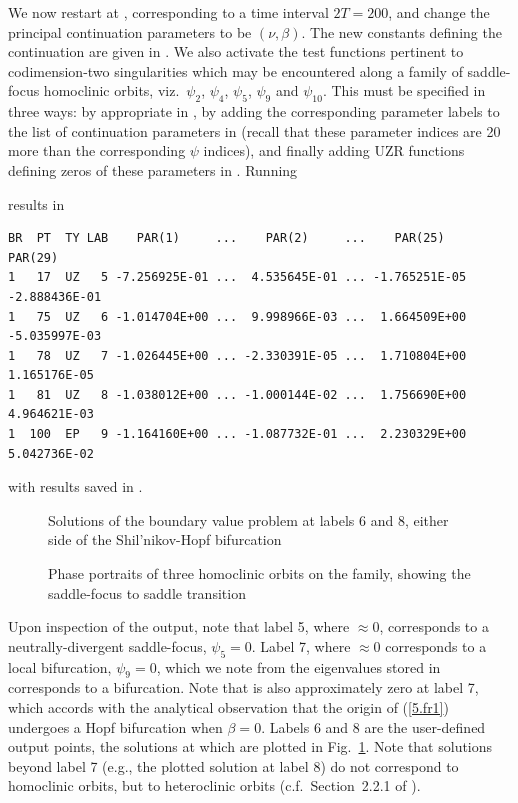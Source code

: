 \documentclass[12pt]{report}
\begin{document}
We now restart at , corresponding to a time interval $2T=200$,
and change the principal continuation parameters to be $(\nu,\beta)$.
The new constants defining the continuation are given in .
We also activate the test functions pertinent to codimension-two
singularities which may be encountered along a family of saddle-focus
homoclinic orbits, viz.\ $\psi_2$, $\psi_4$, $\psi_5$, $\psi_9$ and $\psi_{10}$.
This must be specified in three ways: by appropriate
 in , by adding the corresponding parameter labels
to the list of continuation parameters  in 
(recall that these parameter indices are 20 more than the corresponding
$\psi$ indices), and finally adding UZR functions defining zeros of
these parameters in . Running 
\begin{center}  
\end{center} 
results in
\begin{verbatim}
BR  PT  TY LAB    PAR(1)     ...    PAR(2)     ...    PAR(25)       PAR(29)    
1   17  UZ   5 -7.256925E-01 ...  4.535645E-01 ... -1.765251E-05 -2.888436E-01
1   75  UZ   6 -1.014704E+00 ...  9.998966E-03 ...  1.664509E+00 -5.035997E-03
1   78  UZ   7 -1.026445E+00 ... -2.330391E-05 ...  1.710804E+00  1.165176E-05
1   81  UZ   8 -1.038012E+00 ... -1.000144E-02 ...  1.756690E+00  4.964621E-03  
1  100  EP   9 -1.164160E+00 ... -1.087732E-01 ...  2.230329E+00  5.042736E-02
\end{verbatim}
with results saved in .
\begin{figure}[p]
\epsfysize 9.0cm
\centerline{}
\caption{Solutions of the boundary value problem at labels 6 and 8, 
either side of the Shil'nikov-Hopf bifurcation}
\label{Fcircuit1}
\end{figure}
\begin{figure}[p]
\epsfysize 9.0cm
\centerline{}
\caption{Phase portraits of three homoclinic orbits 
on the family, showing the saddle-focus to saddle transition}
\label{Fcircuit2}
\end{figure}
Upon inspection of the output, note that label 5, where $\approx 0$, 
corresponds to a neutrally-divergent saddle-focus, $\psi_5=0$. 
Label 7, where $\approx 0$ corresponds to a local bifurcation, $\psi_9=0$, 
which we note from the eigenvalues stored in  corresponds to a  bifurcation. Note that  is also approximately zero
at label 7, which accords with the analytical observation that the origin of
(\ref{5.fr1}) undergoes a Hopf bifurcation when $\beta=0$.
Labels 6 and 8 are the user-defined output
points, the solutions at which are plotted in Fig.\ \ref{Fcircuit1}.
Note that solutions beyond label 7 (e.g., the plotted solution
at label 8) do not correspond to homoclinic orbits, but to 
 heteroclinic orbits (c.f.\ Section~2.2.1 of
).
\end{document}
